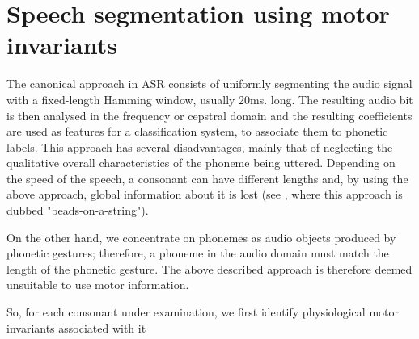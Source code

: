 \section{Speech segmentation using motor invariants}
\label{sec:segm}

The canonical approach in ASR consists of uniformly segmenting the
audio signal with a fixed-length Hamming window, usually 20ms. long.
The resulting audio bit is then analysed in the frequency or cepstral
domain and the resulting coefficients are used as features for a
classification system, to associate them to phonetic labels. This
approach has several disadvantages, mainly that of neglecting the
qualitative overall characteristics of the phoneme being uttered.
Depending on the speed of the speech, a consonant can have different
lengths and, by using the above approach, global information about it
is lost (see \cite{}, where this approach is dubbed "beads-on-a-string").

On the other hand, we concentrate on phonemes as audio objects produced
by phonetic gestures; therefore, a phoneme in the audio domain must match
the length of the phonetic gesture. The above described approach is
therefore deemed unsuitable to use motor information.

So, for each consonant under examination, we first identify physiological
motor invariants associated with it



